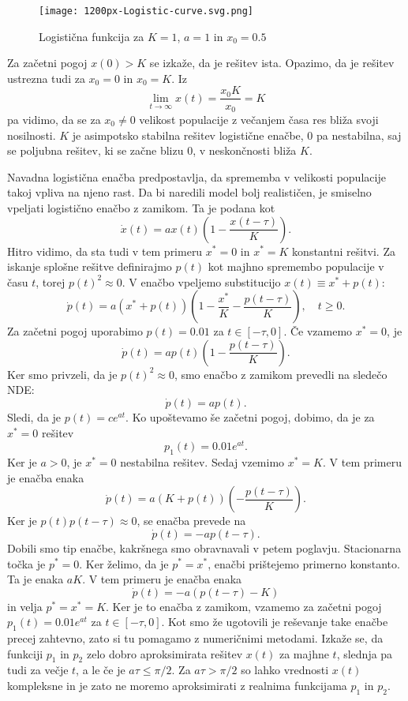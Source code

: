 \documentclass[12pt,a4paper]{amsart}
\theoremstyle{definition} %
\theoremstyle{plain} %
\begin{document}
\begin{figure}[h]
    \texttt{[image: 1200px-Logistic-curve.svg.png]}
    \caption{Logistična funkcija za $K=1$, $a=1$ in $x_0=0.5$}
\end{figure}

\noindent Za začetni pogoj $x(0)>K$ se izkaže, da je rešitev ista.
Opazimo, da je rešitev ustrezna tudi za $x_0=0$ in $x_0=K$. Iz 
\[\lim_{t\to\infty}x(t)=\frac{x_0K}{x_0}=K\]
pa vidimo, da se za $x_0\neq0$ velikost populacije z večanjem časa res bliža svoji nosilnosti. $K$ je asimpotsko stabilna 
rešitev logistične enačbe, 0 pa nestabilna, saj se poljubna rešitev, ki se začne blizu 0, v neskončnosti bliža $K$.


Navadna logistična enačba predpostavlja, da sprememba v velikosti populacije takoj vpliva na njeno rast. Da bi naredili 
model bolj realističen, je smiselno vpeljati logistično enačbo z zamikom. Ta je podana kot 
\[\dot{x}(t)=ax(t)\left(1-\frac{x(t-\tau)}{K}\right).\]
Hitro vidimo, da sta tudi v tem primeru $x^*=0$ in $x^*=K$ konstantni rešitvi. Za iskanje splošne rešitve definirajmo 
$p(t)$ kot majhno spremembo populacije v času $t$, torej $p(t)^2\approx0$. V enačbo vpeljemo substitucijo $x(t)\equiv x^*+p(t)$:
\[\dot{p}(t)=a(x^*+p(t))\left(1-\frac{x^*}{K}-\frac{p(t-\tau)}{K}\right), \quad t\geq0.\]
Za začetni pogoj uporabimo $p(t)=0.01$ za $t\in[-\tau,0]$.
Če vzamemo $x^*=0$, je 
\[\dot{p}(t)=ap(t)\left(1-\frac{p(t-\tau)}{K}\right).\]
Ker smo privzeli, da je $p(t)^2\approx0$, smo enačbo z zamikom prevedli na sledečo NDE:
\[\dot{p}(t)=ap(t).\]
Sledi, da je $p(t)=ce^{at}$. Ko upoštevamo še začetni pogoj, dobimo, da je za $x^*=0$ rešitev 
\[p_1(t)=0.01e^{at}.\] 
Ker je $a>0$, je $x^*=0$ nestabilna rešitev.
Sedaj vzemimo $x^*=K$. V tem primeru je enačba enaka 
\[\dot{p}(t)=a(K+p(t))\left(-\frac{p(t-\tau)}{K}\right).\]
Ker je $p(t)p(t-\tau)\approx0$, se enačba prevede na 
\[\dot{p}(t)=-ap(t-\tau).\]
Dobili smo tip enačbe, kakršnega smo obravnavali v petem poglavju. Stacionarna točka je $p^*=0$. Ker želimo, da 
je $p^*=x^*$, enačbi prištejemo primerno konstanto. Ta je enaka $aK$. V tem primeru je enačba enaka 
\[\dot{p}(t)=-a(p(t-\tau)-K)\]
in velja $p^*=x^*=K$. Ker je to enačba z zamikom, vzamemo za začetni pogoj $p_1(t)=0.01e^{at}$ za $t\in[-\tau,0]$.
Kot smo že ugotovili je reševanje take enačbe precej zahtevno, zato si tu pomagamo z numeričnimi metodami. Izkaže se, da 
funkciji $p_1$ in $p_2$ zelo dobro aproksimirata rešitev $x(t)$ za majhne $t$, slednja pa tudi za večje $t$, a le če 
je $a\tau \leq \pi/2$. Za $a\tau>\pi/2$ so lahko vrednosti $x(t)$ kompleksne in je zato ne moremo aproksimirati z 
realnima funkcijama $p_1$ in $p_2$. 
\end{document}
